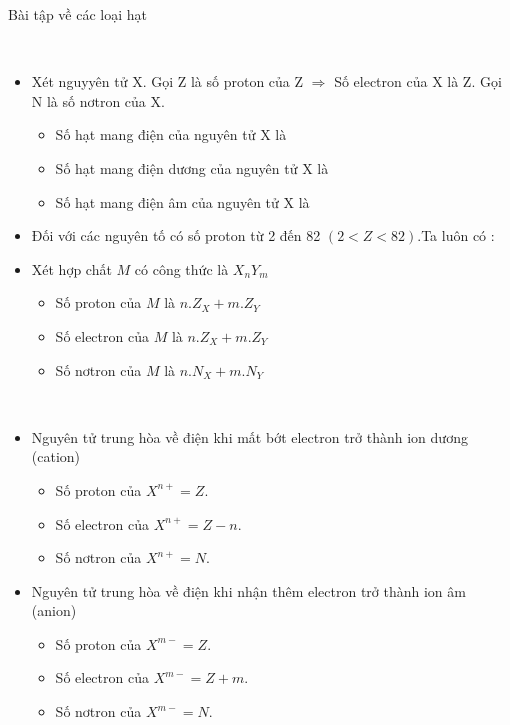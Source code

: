 \newpage
\begin{dang}{Bài tập về các loại hạt}
\end{dang}
\\
\begin{itemize}
	\item	Xét nguyyên tử X. Gọi Z là số proton của Z
	$ \Rightarrow $ Số electron của X là Z.
	Gọi N  là số nơtron của X.
	\begin{itemize}
		\item Số hạt mang điện của nguyên tử X là 
		\item Số hạt mang điện dương của nguyên tử X là 
		\item Số hạt mang điện âm của nguyên tử X là 
	\end{itemize}
	\item Đối với các nguyên tố có số proton từ 2 đến 82 $ (2<Z<82) $.Ta luôn có : 
	\item Xét hợp chất $ M $ có công thức là $ X_{n}Y_{m} $
	\begin{itemize}
		\item Số proton của $ M $ là $ n.Z_{X} + m.Z_{Y} $
		\item Số electron của $ M $ là $ n.Z_{X} + m.Z_{Y} $
		\item Số nơtron của $ M $ là $ n.N_{X} + m.N_{Y} $
	\end{itemize}
\end{itemize}
\\
\begin{itemize}
	\item Nguyên tử trung hòa về điện khi  mất bớt electron trở thành ion dương (cation)
	\begin{center}
	\end{center}
	\begin{itemize}
		\item Số proton của $ X^{n+} = Z $.
		\item Số electron của $ X^{n+} = Z-n $.
		\item Số nơtron của $ X^{n+} = N $.
	\end{itemize}
	\item Nguyên tử trung hòa về điện khi nhận thêm electron trở thành ion âm (anion)
	\begin{center}
	\end{center}
	\begin{itemize}
		\item Số proton của $ X^{m-} = Z $.
		\item Số electron của $ X^{m-} = Z+m $.
		\item Số nơtron của $ X^{m-} = N $.
	\end{itemize}
\end{itemize}
